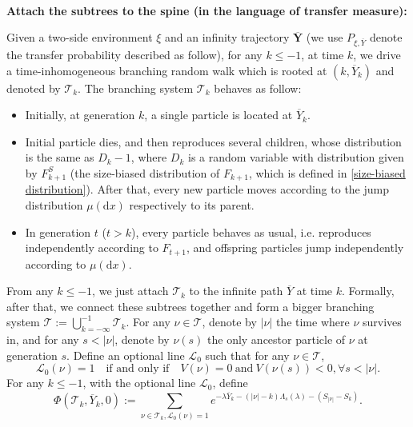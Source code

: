 \documentclass[]{article}
\numberwithin{equation}{section}
\theoremstyle{thmstyleone}%
\theoremstyle{thmstyletwo}%
\theoremstyle{thmstylethree}%
\theoremstyle{thmstylefour}%
\theoremstyle{thmstylefive}%
\theoremstyle{thmstylesix}%
\renewcommand{\d}{\mathrm{d}}
\begin{document}
	\
	
	\noindent\textbf{Attach the subtrees to the spine (in the language of transfer measure):}
	
	Given a two-side environment $\xi$ and an infinity trajectory $\overline{\textbf{Y}}$ (we use $P_{\xi,\overline{Y}}$ denote the transfer probability described as follow), for any $k\leqslant -1$, at time $k$, we drive a time-inhomogeneous branching random walk which is rooted at $(k,\overline{Y}_k)$ and denoted by $\mathcal{T}_k$. The branching system $\mathcal{T}_k$ behaves as follow:
	
	\begin{itemize}
		\item Initially, at generation $k$, a single particle is located at $\overline{Y}_{k}$. 
		\item Initial particle dies, and then reproduces several children, whose distribution is the same as $D_k-1$, where $D_k$ is a random variable with distribution given by $F^S_{k+1}$ (the size-biased distribution of $F_{k+1}$, which is defined in \cref{size-biased distribution}).
		After that, every new particle moves according to the jump distribution $\mu(\d x)$ respectively to its parent.
		\item In generation $t$ ($t> k$), every particle behaves as usual, i.e. reproduces independently according to $F_{t+1}$, and offspring particles jump independently according to $\mu(\d x)$.
	\end{itemize}
	
	From any $k\leqslant-1$, we just attach $\mathcal{T}_k$ to the infinite path $\overline{Y}$ at time $k$. Formally, after that, we connect these subtrees together and form a bigger branching system $\mathcal{T}:= \bigcup\limits_{k=-\infty}^{-1} \mathcal{T}_k $.
	For any $\nu \in \mathcal{T}$, denote by $|\nu|$ the time where $\nu$ survives in, 
	and for any $s<|\nu|$, denote by $\nu(s)$ the only ancestor particle of $\nu$ at generation $s$.
	Define an optional line $\mathcal{L}_0$ such that for any $\nu\in\mathcal{T}$,
	\begin{equation}
		\mathcal{L}_0(\nu) = 1 \quad \text{if and only if} \quad 
		V(\nu) = 0 ~\text{and}~ V(\nu(s)) <0,\forall s<|\nu|.
	\end{equation}
	For any $ k\leqslant -1$, with the optional line $\mathcal{L}_0$, define
	\begin{equation}\label{def of Phik}
		\Phi(\mathcal{T}_k,\overline{Y}_k,0):= \sum\limits_{\nu \in \mathcal{T}_k, \mathcal{L}_0(\nu)=1} e^{-\lambda\overline{Y}_k-(|\nu|-k)\Lambda_s(\lambda)-(S_{|\nu|}-S_k)}.
	\end{equation}
	
\end{document}
